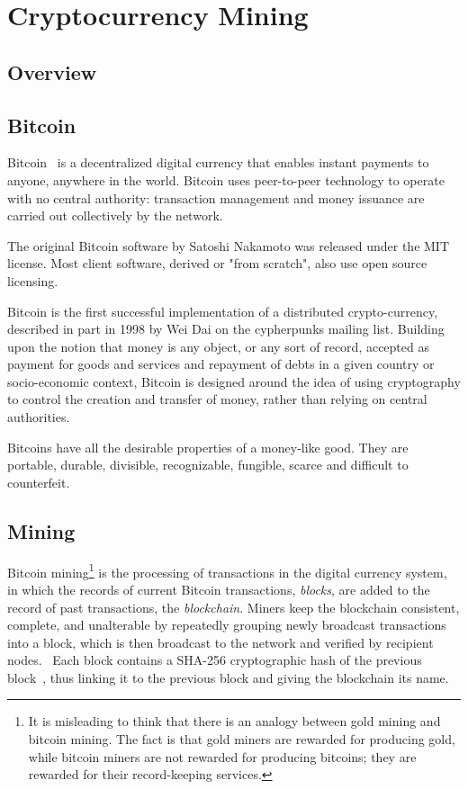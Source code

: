 \chapter*{Cryptocurrency Mining}
%
\setcounter{section}{0}
\section{Overview}
%
\section{Bitcoin}
Bitcoin~\cite{Nakamoto_bitcoin:a} is a decentralized digital currency that enables instant payments to anyone, anywhere in the world. Bitcoin uses peer-to-peer technology to operate with no central authority: transaction management and money issuance are carried out collectively by the network.

The original Bitcoin software by Satoshi Nakamoto was released under the MIT license. Most client software, derived or "from scratch", also use open source licensing.

Bitcoin is the first successful implementation of a distributed crypto-currency, described in part in 1998 by Wei Dai on the cypherpunks mailing list. Building upon the notion that money is any object, or any sort of record, accepted as payment for goods and services and repayment of debts in a given country or socio-economic context, Bitcoin is designed around the idea of using cryptography to control the creation and transfer of money, rather than relying on central authorities.

Bitcoins have all the desirable properties of a money-like good. They are portable, durable, divisible, recognizable, fungible, scarce and difficult to counterfeit.

%
\section{Mining}
Bitcoin mining\footnote{It is misleading to think that there is an analogy between gold mining and bitcoin mining. The fact is that gold miners are rewarded for producing gold, while bitcoin miners are not rewarded for producing bitcoins; they are rewarded for their record-keeping services.} is the processing of transactions in the digital currency system, in which the records of current Bitcoin transactions, \textit{blocks}, are added to the record of past transactions, the \textit{blockchain}. Miners keep the blockchain consistent, complete, and unalterable by repeatedly grouping newly broadcast transactions into a block, which is then broadcast to the network and verified by recipient nodes.~\cite{economist} Each block contains a SHA-256 cryptographic hash of the previous block~\cite{economist}, thus linking it to the previous block and giving the blockchain its name.

